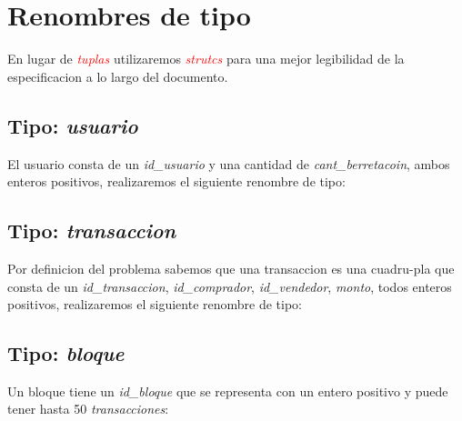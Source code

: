 \documentclass[10pt,a4paper]{article}
\begin{document}
\maketitle

\section{Renombres de tipo}
En lugar de \textcolor{red}{\textit{tuplas}} utilizaremos \textcolor{red}{\textit{strutcs}} para una mejor legibilidad de la especificacion a lo largo del documento.
\subsection{Tipo: \textit{usuario}}
El usuario consta de un \textit{id\_usuario} y una cantidad de \textit{cant\_berretacoin}, ambos enteros positivos, realizaremos el siguiente renombre de tipo:

\vspace{0.3cm}
\noindent
{}
\vspace{0.1cm}

\subsection{Tipo: \textit{transaccion}}
Por definicion del problema sabemos que una transaccion es una cuadru-pla que consta de un \textit{id\_transaccion}, \textit{id\_comprador}, \textit{id\_vendedor}, \textit{monto}, todos enteros positivos, realizaremos el siguiente renombre de tipo:

\vspace{0.3cm}
\noindent
{}
\vspace{0.1cm}

\subsection{Tipo: \textit{bloque}}
Un bloque tiene un \textit{id\_bloque} que se representa con un entero positivo y puede tener hasta 50 \textit{transacciones}:
\end{document}
